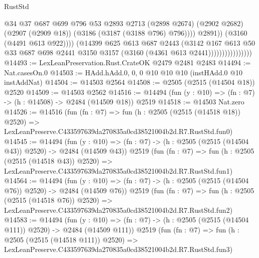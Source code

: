\begin{lexlean}{RustStd}
\begin{coremodule}
                                        @34
                                        @37
                                        @687
                                        @699
                                        @796
                                        @53
                                        @2893
                                        @2713
                                        (@2898 @2674)
                                        (@2902 @2682)
                                        (@2907 (@2909 @18))
                                        (@3186 (@3187 (@3188 @796) @796))))
                                    @2891))
                                (@3160 (@4491 @613 @922))))
                            (@14399
                              @625
                              @613
                              @687
                              @2443
                              (@3142
                                @167
                                @613
                                @50
                                @33
                                @687
                                @698
                                @2441
                                @3150
                                @3157
                                (@3160 (@4361 @613 @2441))))))))))))))))
@14493 := LexLeanPreservation.Rust.CrateOK @2479 @2481 @2483
@14494 := Nat.casesOn.{0}
@14503 := HAdd.hAdd.{0, 0, 0} @10 @10 @10 (instHAdd.{0} @10 instAddNat)
@14504 := @14503 @2564
@14508 := @2505 (@2515 (@14504 @18)) @2520
@14509 := @14503 @2562
@14516 := @14494 (fun (y : @10) => (fn : @7) -> (h : @14508) -> @2484 (@14509 @18)) @2519
@14518 := @14503 Nat.zero
@14526 := @14516
    (fun (fn : @7) =>
    fun (h : @2505 (@2515 (@14518 @18)) @2520) =>
    LexLeanPreserve.C433597639da270835a0cd38521004b2d.R7.RustStd.fun0)
@14545 := @14494
    (fun (y : @10) => (fn : @7) -> (h : @2505 (@2515 (@14504 @43)) @2520) -> @2484 (@14509 @43))
    @2519
    (fun (fn : @7) =>
    fun (h : @2505 (@2515 (@14518 @43)) @2520) =>
    LexLeanPreserve.C433597639da270835a0cd38521004b2d.R7.RustStd.fun1)
@14564 := @14494
    (fun (y : @10) => (fn : @7) -> (h : @2505 (@2515 (@14504 @76)) @2520) -> @2484 (@14509 @76))
    @2519
    (fun (fn : @7) =>
    fun (h : @2505 (@2515 (@14518 @76)) @2520) =>
    LexLeanPreserve.C433597639da270835a0cd38521004b2d.R7.RustStd.fun2)
@14583 := @14494
    (fun (y : @10) => (fn : @7) -> (h : @2505 (@2515 (@14504 @111)) @2520) -> @2484 (@14509 @111))
    @2519
    (fun (fn : @7) =>
    fun (h : @2505 (@2515 (@14518 @111)) @2520) =>
    LexLeanPreserve.C433597639da270835a0cd38521004b2d.R7.RustStd.fun3)

\end{coremodule}
\end{lexlean}
